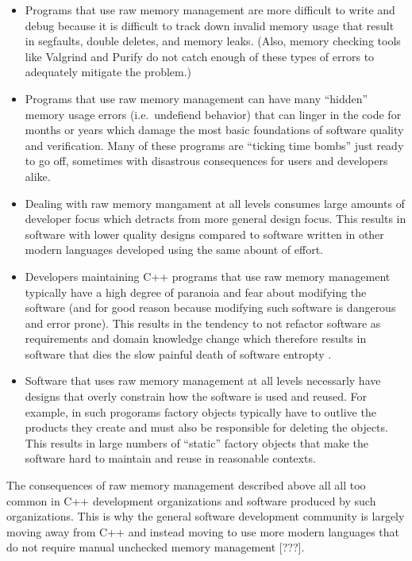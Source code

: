 \documentclass[pdf,ps2pdf,11pt]{SANDreport}
\begin{document}
\begin{itemize}

{}\item Programs that use raw memory management are more difficult to
write and debug because it is difficult to track down invalid memory
usage that result in segfaults, double deletes, and memory leaks.
(Also, memory checking tools like Valgrind and Purify do not catch
enough of these types of errors to adequately mitigate the problem.)

{}\item Programs that use raw memory management can have many
``hidden'' memory usage errors (i.e.\ undefiend behavior) that can
linger in the code for months or years which damage the most basic
foundations of software quality and verification.  Many of these
programs are ``ticking time bombs'' just ready to go off, sometimes
with disastrous consequences for users and developers alike.

{}\item Dealing with raw memory mangament at all levels consumes large
amounts of developer focus which detracts from more general design
focus.  This results in software with lower quality designs compared
to software written in other modern languages developed using the same
abount of effort.

{}\item Developers maintaining C++ programs that use raw memory
management typically have a high degree of paranoia and fear about
modifying the software (and for good reason because modifying such
software is dangerous and error prone).  This results in the tendency
to not refactor software as requirements and domain knowledge change
{}\cite{DomainDrivenDesign} which therefore results in software that
dies the slow painful death of software entropty
{}\cite{MythicalManMonth95}.

{}\item Software that uses raw memory management at all levels
necessarly have designs that overly constrain how the software is used
and reused.  For example, in such progorams factory objects typically
have to outlive the products they create and must also be responsible
for deleting the objects.  This results in large numbers of ``static''
factory objects that make the software hard to maintain and reuse in
reasonable contexts.

\end{itemize}

The consequences of raw memory management described above all all too
common in C++ development organizations and software produced by such
organizations.  This is why the general software development community
is largely moving away from C++ and instead moving to use more modern
languages that do not require manual unchecked memory management
[???].
\end{document}
